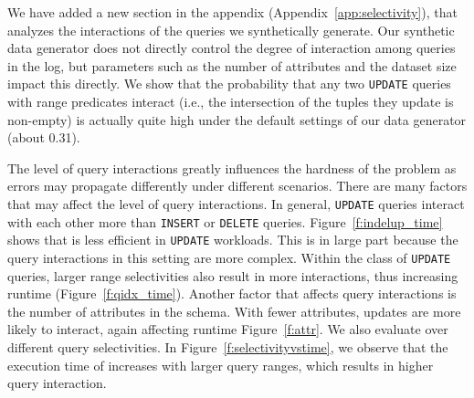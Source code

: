 We have added a new section in the appendix (Appendix~\ref{app:selectivity}),
that analyzes the interactions of the queries we synthetically generate. Our
synthetic data generator does not directly control the degree of interaction
among queries in the log, but parameters such as the number of attributes and
the dataset size impact this directly. We show that the probability that any
two \texttt{UPDATE} queries with range predicates interact (i.e., the
intersection of the tuples they update is non-empty) is actually quite high
under the default settings of our data generator (about 0.31).

The level of query interactions greatly influences the hardness of the problem
as errors may propagate differently under different scenarios. There are many
factors that may affect the level of query interactions. In general,
\texttt{UPDATE} queries interact with each other more than \texttt{INSERT} or
\texttt{DELETE} queries. Figure~\ref{f:indelup_time} shows that \sys is less
efficient in \texttt{UPDATE} workloads. This is in large part because the
query interactions in this setting are more complex. Within the class of
\texttt{UPDATE} queries, larger range selectivities also result in more
interactions, thus increasing runtime (Figure~\ref{f:qidx_time}). Another
factor that affects query interactions is the number of attributes in the
schema. With fewer attributes, updates are more likely to interact, again
affecting runtime Figure~\ref{f:attr}. We also evaluate \sys over different
query selectivities. In Figure~\ref{f:selectivityvstime}, we observe that the
execution time of \sys increases with larger query ranges, which results in
higher query interaction.

% 


